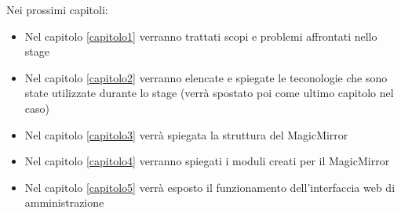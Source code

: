 Nei prossimi capitoli:
\begin{itemize}
\item Nel capitolo \ref{capitolo1} verranno trattati scopi e problemi affrontati nello stage
\item Nel capitolo \ref{capitolo2} verranno elencate e spiegate le teconologie che sono state utilizzate
durante lo stage (verr\`a spostato poi come ultimo capitolo nel caso)
\item Nel capitolo \ref{capitolo3} verr\`a spiegata la struttura del MagicMirror
\item Nel capitolo \ref{capitolo4} verranno spiegati i moduli creati per il MagicMirror
\item Nel capitolo \ref{capitolo5} verr\`a esposto il funzionamento dell'interfaccia web di amministrazione
\end{itemize}

